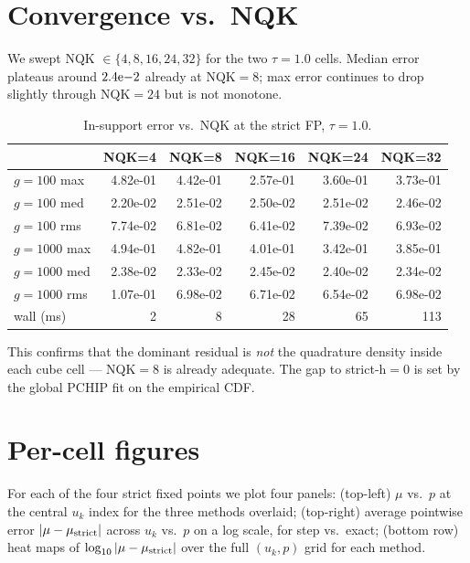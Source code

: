 \documentclass[10pt]{article}
\begin{document}
\section{Convergence vs.\ NQK}

We swept NQK $\in\{4,8,16,24,32\}$ for the two $\tau{=}1.0$ cells. Median
error plateaus around $2.4{\rm e}{-}2$ already at NQK$=8$; max error
continues to drop slightly through NQK$=24$ but is not monotone.

\begin{table}[h]
\centering\small
\caption{In-support error vs.\ NQK at the strict FP, $\tau=1.0$.}
\begin{tabular}{lrrrrr}
\toprule
& NQK=4 & NQK=8 & NQK=16 & NQK=24 & NQK=32\\
\midrule
$g\!=\!100$  max & 4.82e-01 & 4.42e-01 & 2.57e-01 & 3.60e-01 & 3.73e-01\\
$g\!=\!100$  med & 2.20e-02 & 2.51e-02 & 2.50e-02 & 2.51e-02 & 2.46e-02\\
$g\!=\!100$  rms & 7.74e-02 & 6.81e-02 & 6.41e-02 & 7.39e-02 & 6.93e-02\\
$g\!=\!1000$ max & 4.94e-01 & 4.82e-01 & 4.01e-01 & 3.42e-01 & 3.85e-01\\
$g\!=\!1000$ med & 2.38e-02 & 2.33e-02 & 2.45e-02 & 2.40e-02 & 2.34e-02\\
$g\!=\!1000$ rms & 1.07e-01 & 6.98e-02 & 6.71e-02 & 6.54e-02 & 6.98e-02\\
wall (ms)         & 2        & 8        & 28      & 65      & 113\\
\bottomrule
\end{tabular}
\end{table}

This confirms that the dominant residual is \emph{not} the quadrature
density inside each cube cell --- NQK$=8$ is already adequate. The gap
to strict-h$=0$ is set by the global PCHIP fit on the empirical CDF.

\section{Per-cell figures}

For each of the four strict fixed points we plot four panels:
(top-left) $\mu$ vs.\ $p$ at the central $u_k$ index for the three
methods overlaid; (top-right) average pointwise error $|\mu-\mu_{\rm strict}|$
across $u_k$ vs.\ $p$ on a log scale, for step vs.\ exact;
(bottom row) heat maps of $\log_{10}|\mu - \mu_{\rm strict}|$ over the
full $(u_k,p)$ grid for each method.
\end{document}
